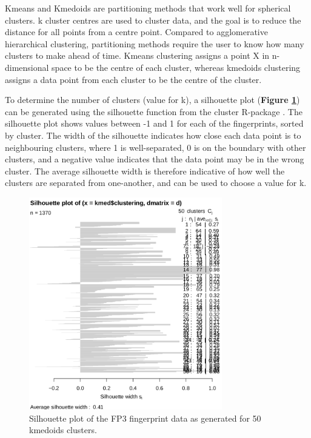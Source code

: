 \documentclass[11pt]{article}
\begin{document}
Kmeans and Kmedoids are partitioning methods that work well for spherical clusters. k cluster centres are used to cluster data, and the goal is to reduce the distance for all points from a centre point. Compared to agglomerative hierarchical clustering, partitioning methods require the user to know how many clusters to make ahead of time. Kmeans clustering assigns a point X in n-dimensional space to be the centre of each cluster, whereas kmedoids clustering assigns a data point from each cluster to be the centre of the cluster.

To determine the number of clusters (value for k), a silhouette plot (\textbf{Figure \ref{silhouettte-plot}}) can be generated using the silhouette function from the cluster R-package \cite{r-cluster}. The silhouette plot shows values between -1 and 1 for each of the fingerprints, sorted by cluster. The width of the silhouette indicates how close each data point is to neighbouring clusters, where 1 is well-separated, 0 is on the boundary with other clusters, and a negative value indicates that the data point may be in the wrong cluster. The average silhouette width is therefore indicative of how well the clusters are separated from one-another, and can be used to choose a value for k.

\begin{figure}[H]
    \centering
    \includegraphics[width=0.75\textwidth]{silhouette_kmed_fp3.png}
    \caption{Silhouette plot of the FP3 fingerprint data as generated for 50 kmedoids clusters.}
    \label{silhouettte-plot}
\end{figure}
\end{document}
